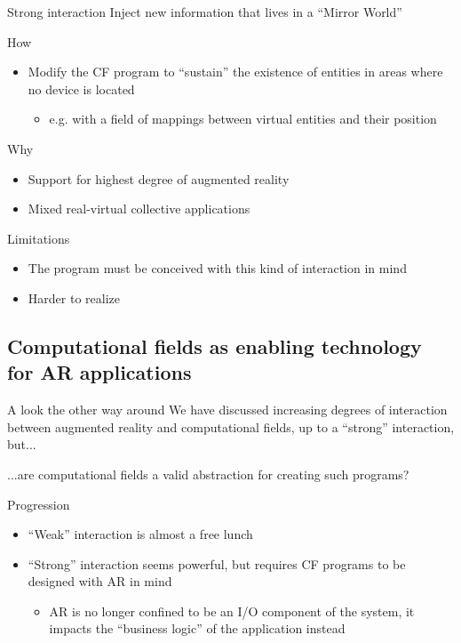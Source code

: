 \documentclass[presentation]{beamer} %
\begin{document}
\begin{frame}{Strong interaction}
  Inject new information that lives in a ``Mirror World''
  \begin{block} {How}
   \begin{itemize}
    \item Modify the CF program to ``sustain'' the existence of entities in areas where no device is located
    \begin{itemize}
      \item e.g. with a field of mappings between virtual entities and their position
    \end{itemize}
   \end{itemize}
  \end{block}
  \begin{block} {Why}
   \begin{itemize}
    \item Support for highest degree of augmented reality
    \item Mixed real-virtual collective applications
   \end{itemize}
  \end{block}
  \begin{block} {Limitations}
   \begin{itemize}
    \item The program must be conceived with this kind of interaction in mind
    \item Harder to realize
   \end{itemize}
  \end{block}
\end{frame}


\subsection{Computational fields as enabling technology for AR applications}
\begin{frame}{A look the other way around}
  We have discussed increasing degrees of interaction between augmented reality and computational fields, up to a ``strong'' interaction, but...
  \begin{block}{}
    ...are computational fields a valid abstraction for creating such programs?
  \end{block}
  \begin{block} {Progression}
   \begin{itemize}
    \item ``Weak'' interaction is almost a free lunch
    \item ``Strong'' interaction seems powerful, but requires CF programs to be designed with AR in mind
    \begin{itemize}
      \item AR is no longer confined to be an I/O component of the system, it impacts the ``business logic'' of the application instead
    \end{itemize}
   \end{itemize}
  \end{block}
\end{frame}
\end{document}
